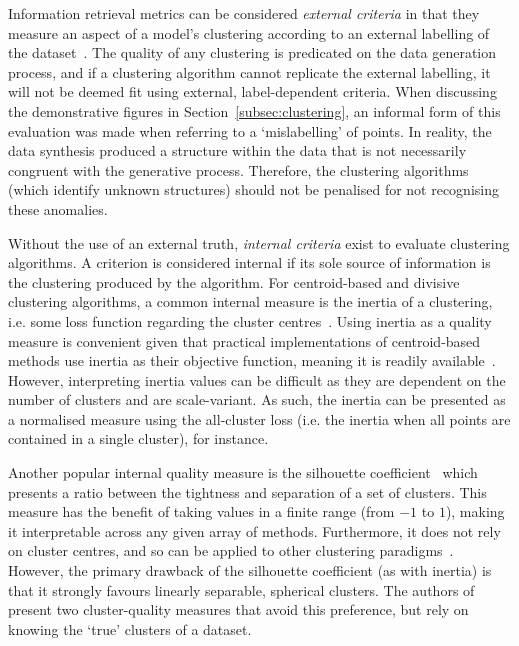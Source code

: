 Information retrieval metrics can be considered \emph{external criteria} in that
they measure an aspect of a model's clustering according to an external labelling
of the dataset~\cite{Mitchell1997}. The quality of any
clustering is predicated on the data generation process, and if a clustering
algorithm cannot replicate the external labelling, it will not be deemed fit
using external, label-dependent criteria. When discussing the demonstrative
figures in Section~\ref{subsec:clustering}, an informal form of this evaluation
was made when referring to a `mislabelling' of points. In reality, the data
synthesis produced a structure within the data that is not necessarily congruent
with the generative process. Therefore, the clustering algorithms (which
identify unknown structures) should not be penalised for not recognising these
anomalies.

Without the use of an external truth, \emph{internal criteria} exist to evaluate
clustering algorithms. A criterion is considered internal if its sole source of
information is the clustering produced by the algorithm. For centroid-based and
divisive clustering algorithms, a common internal measure is the inertia of a
clustering, i.e. some loss function regarding the cluster
centres~\cite{Everitt2011}. Using inertia as a quality measure is convenient
given that practical implementations of centroid-based methods use inertia as
their objective function, meaning it is readily available~\cite{scikit-learn}.
However, interpreting inertia values can be difficult as they are dependent on
the number of clusters and are scale-variant. As such, the inertia can be
presented as a normalised measure using the all-cluster loss (i.e. the inertia
when all points are contained in a single cluster), for instance.

Another popular internal quality measure is the silhouette
coefficient~\cite{Rousseeuw1987} which presents a ratio between the tightness
and separation of a set of clusters. This measure has the benefit of taking
values in a finite range (from \(-1\) to \(1\)), making it interpretable across
any given array of methods. Furthermore, it does not rely on cluster centres,
and so can be applied to other clustering
paradigms~\cite{Garcia2011,Guan2019,Starczewski2015}. However, the primary
drawback of the silhouette coefficient (as with inertia) is that it strongly
favours linearly separable, spherical clusters. The authors
of~\cite{Frederix2004} present two cluster-quality measures that avoid this
preference, but rely on knowing the `true' clusters of a dataset.

